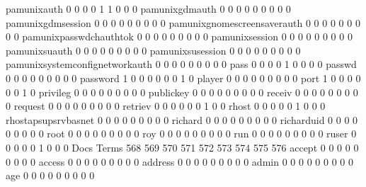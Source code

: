 \documentclass[compress,8pt]{beamer}
\begin{document}
\begin{frame}
\begin{Schunk}
  pamunixauth                                0   0   0   0   1   1   0   0   0
  pamunixgdmauth                             0   0   0   0   0   0   0   0   0
  pamunixgdmsession                          0   0   0   0   0   0   0   0   0
  pamunixgnomescreensaverauth                0   0   0   0   0   0   0   0   0
  pamunixpasswdchauthtok                     0   0   0   0   0   0   0   0   0
  pamunixsession                             0   0   0   0   0   0   0   0   0
  pamunixsuauth                              0   0   0   0   0   0   0   0   0
  pamunixsusession                           0   0   0   0   0   0   0   0   0
  pamunixsystemconfignetworkauth             0   0   0   0   0   0   0   0   0
  pass                                       0   0   0   0   1   0   0   0   0
  passwd                                     0   0   0   0   0   0   0   0   0
  password                                   1   0   0   0   0   0   0   1   0
  player                                     0   0   0   0   0   0   0   0   0
  port                                       1   0   0   0   0   0   0   1   0
  privileg                                   0   0   0   0   0   0   0   0   0
  publickey                                  0   0   0   0   0   0   0   0   0
  receiv                                     0   0   0   0   0   0   0   0   0
  request                                    0   0   0   0   0   0   0   0   0
  retriev                                    0   0   0   0   0   0   1   0   0
  rhost                                      0   0   0   0   0   1   0   0   0
  rhostapsupsrvbasnet                        0   0   0   0   0   0   0   0   0
  richard                                    0   0   0   0   0   0   0   0   0
  richarduid                                 0   0   0   0   0   0   0   0   0
  root                                       0   0   0   0   0   0   0   0   0
  roy                                        0   0   0   0   0   0   0   0   0
  run                                        0   0   0   0   0   0   0   0   0
  ruser                                      0   0   0   0   0   1   0   0   0
                                          Docs
Terms                                      568 569 570 571 572 573 574 575 576
  accept                                     0   0   0   0   0   0   0   0   0
  access                                     0   0   0   0   0   0   0   0   0
  address                                    0   0   0   0   0   0   0   0   0
  admin                                      0   0   0   0   0   0   0   0   0
  age                                        0   0   0   0   0   0   0   0   0

\end{Schunk}
\end{frame}
\end{document}
